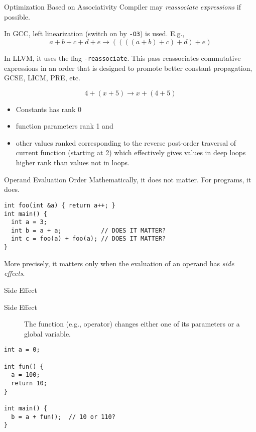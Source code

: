 \documentclass[presentation]{beamer}
\begin{document}
\begin{frame}[fragile,label={sec:orgheadline10}]{Optimization Based on Associativity}
 Compiler may \emph{reassociate expressions} if possible.

In GCC, left linearization (switch on by \texttt{-O3}) is used.  E.g.,
\[a + b + c + d + e \rightarrow ((((a + b) + c) + d) + e)\]

In LLVM, it uses the flag \texttt{-reassociate}.  This pass reassociates
commutative expressions in an order that is designed to promote
better constant propagation, GCSE, LICM, PRE, etc.

\[4 + (x + 5) \rightarrow x + (4 + 5)\]

\begin{itemize}
\item Constants has rank 0
\item function parameters rank 1 and
\item other values ranked corresponding to the reverse post-order
traversal of current function (starting at 2) which effectively
gives values in deep loops higher rank than values not in loops.
\end{itemize}
\end{frame}

\begin{frame}[fragile,label={sec:orgheadline11}]{Operand Evaluation Order}
 Mathematically, it does not matter.  For programs, it does.

\begin{verbatim}
int foo(int &a) { return a++; }
int main() {
  int a = 3;
  int b = a + a;           // DOES IT MATTER?
  int c = foo(a) + foo(a); // DOES IT MATTER?
}
\end{verbatim}

More precisely, it matters only when the evaluation of an operand
has \emph{side effects}.
\end{frame}

\begin{frame}[fragile,label={sec:orgheadline12}]{Side Effect}
 \begin{description}
\item[{Side Effect}] The function (e.g., operator) changes either one
of its parameters or a global variable.
\end{description}


\begin{verbatim}
int a = 0;

int fun() {
  a = 100;
  return 10;
}

int main() {
  b = a + fun();  // 10 or 110?
}
\end{verbatim}
\end{frame}
\end{document}
